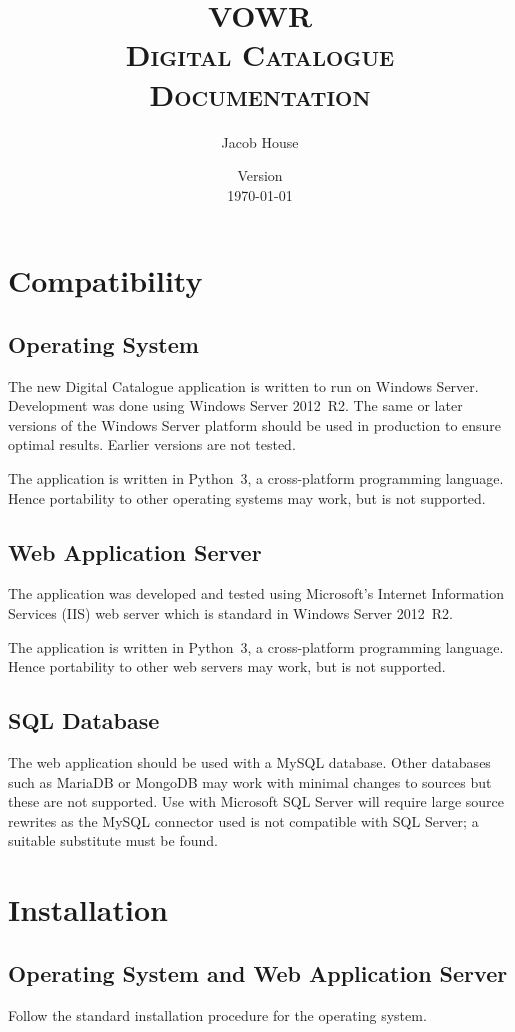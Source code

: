 \documentclass{book}
\title{\scshape {\Huge VOWR}\\Digital Catalogue\\Documentation}
\author{Jacob House}
\date{Version \version\\\today}
\renewcommand{\,}{\kern0.2ex}
\begin{document}
	\maketitle
	
	\section{Compatibility}
	\subsection{Operating System}
	The new Digital Catalogue application is written to run on Windows Server. Development was done using Windows Server 2012~R2. The same or later versions of the Windows Server platform should be used in production to ensure optimal results. Earlier versions are not tested.
	
	The application is written in Python~3, a cross-platform programming language. Hence portability to other operating systems may work, but is not supported.
	
	\subsection{Web Application Server}
	The application was developed and tested using Microsoft's Internet Information Services (IIS) web server which is standard in Windows Server 2012~R2.
	
	The application is written in Python~3, a cross-platform programming language. Hence portability to other web servers may work, but is not supported.
	
	\subsection{SQL Database}
	The web application should be used with a MySQL database. Other databases such as MariaDB or MongoDB may work with minimal changes to sources but these are not supported. Use with Microsoft SQL Server will require large source rewrites as the MySQL connector used is not compatible with SQL Server; a suitable substitute must be found.
	
	
	\section{Installation}
	\subsection{Operating System and Web Application Server}
	Follow the standard installation procedure for the operating system. 
	
\end{document}
